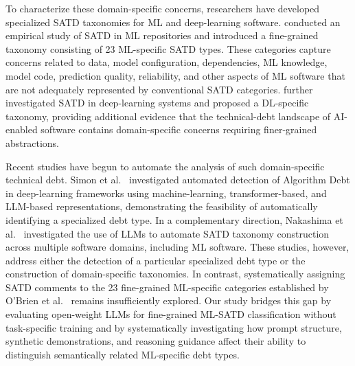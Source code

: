 \documentclass[acmsmall,screen,review,anonymous]{acmart}
\begin{document}
To characterize these domain-specific concerns, researchers have developed specialized SATD taxonomies for ML and deep-learning software. \citet{obrien202223} conducted an empirical study of SATD in ML repositories and introduced a fine-grained taxonomy consisting of 23 ML-specific SATD types. These categories capture concerns related to data, model configuration, dependencies, ML knowledge, model code, prediction quality, reliability, and other aspects of ML software that are not adequately represented by conventional SATD categories. \citet{pepe2024taxonomy} further investigated SATD in deep-learning systems and proposed a DL-specific taxonomy, providing additional evidence that the technical-debt landscape of AI-enabled software contains domain-specific concerns requiring finer-grained abstractions.

Recent studies have begun to automate the analysis of such domain-specific technical debt. Simon et al.~\cite{simon2026automated} investigated automated detection of Algorithm Debt in deep-learning frameworks using machine-learning, transformer-based, and LLM-based representations, demonstrating the feasibility of automatically identifying a specialized debt type. In a complementary direction, Nakashima et al.~\cite{nakashima2025far} investigated the use of LLMs to automate SATD taxonomy construction across multiple software domains, including ML software. These studies, however, address either the detection of a particular specialized debt type or the construction of domain-specific taxonomies. In contrast, systematically assigning SATD comments to the 23 fine-grained ML-specific categories established by O'Brien et al.~\cite{obrien202223} remains insufficiently explored. Our study bridges this gap by evaluating open-weight LLMs for fine-grained ML-SATD classification without task-specific training and by systematically investigating how prompt structure, synthetic demonstrations, and reasoning guidance affect their ability to distinguish semantically related ML-specific debt types.


\end{document}

